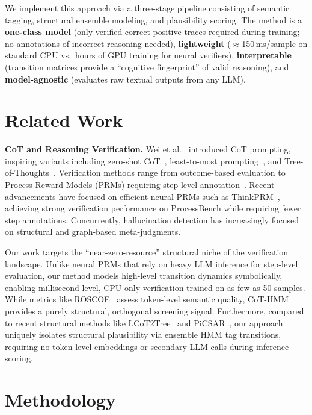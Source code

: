 \documentclass{llncs}
\begin{document}
We implement this approach via a three-stage pipeline consisting of semantic tagging, structural ensemble modeling, and plausibility scoring. The method is a \textbf{one-class model} (only verified-correct positive traces required during training; no annotations of incorrect reasoning needed), \textbf{lightweight} ($\approx$150\,ms/sample on standard CPU vs.\ hours of GPU training for neural verifiers), \textbf{interpretable} (transition matrices provide a ``cognitive fingerprint'' of valid reasoning), and \textbf{model-agnostic} (evaluates raw textual outputs from any LLM).

\section{Related Work}

\textbf{CoT and Reasoning Verification.} Wei et al.~\cite{wei2022chain} introduced CoT prompting, inspiring variants including zero-shot CoT~\cite{kojima2022large}, least-to-most prompting~\cite{zhou2023least}, and Tree-of-Thoughts~\cite{yao2023tree}. Verification methods range from outcome-based evaluation to Process Reward Models (PRMs) requiring step-level annotation~\cite{lightman2024let,wang-etal-2024-math-shepherd}. Recent advancements have focused on efficient neural PRMs such as ThinkPRM~\cite{khalifa2025}, achieving strong verification performance on ProcessBench while requiring fewer step annotations. Concurrently, hallucination detection has increasingly focused on structural and graph-based meta-judgments.

Our work targets the ``near-zero-resource'' structural niche of the verification landscape. Unlike neural PRMs that rely on heavy LLM inference for step-level evaluation, our method models high-level transition dynamics symbolically, enabling millisecond-level, CPU-only verification trained on as few as 50 samples. While metrics like ROSCOE~\cite{golovneva2023roscoe} assess token-level semantic quality, CoT-HMM provides a purely structural, orthogonal screening signal. Furthermore, compared to recent structural methods like LCoT2Tree~\cite{lcot2tree2025} and PiCSAR~\cite{picsar2025}, our approach uniquely isolates structural plausibility via ensemble HMM tag transitions, requiring no token-level embeddings or secondary LLM calls during inference scoring.

\section{Methodology}
\end{document}
